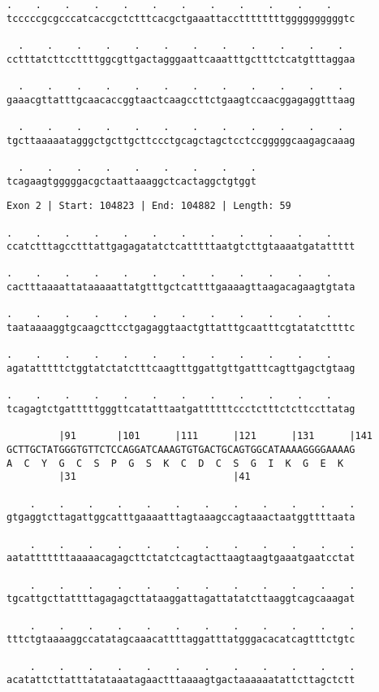 \documentclass{article}
\begin{document}
\newpage
\begin{Verbatim}[fontfamily=courier]
  .    .    .    .    .    .    .    .    .    .    .    .  
tcccccgcgcccatcaccgctctttcacgctgaaattaccttttttttggggggggggtc

  .    .    .    .    .    .    .    .    .    .    .    .  
cctttatcttccttttggcgttgactagggaattcaaatttgctttctcatgtttaggaa

  .    .    .    .    .    .    .    .    .    .    .    .  
gaaacgttatttgcaacaccggtaactcaagccttctgaagtccaacggagaggtttaag

  .    .    .    .    .    .    .    .    .    .    .    .  
tgcttaaaaatagggctgcttgcttccctgcagctagctcctccgggggcaagagcaaag

  .    .    .    .    .    .    .    .    .
tcagaagtgggggacgctaattaaaggctcactaggctgtggt
\end{Verbatim}
\newpage
\begin{Verbatim}[fontfamily=courier]
Exon 2 | Start: 104823 | End: 104882 | Length: 59

.    .    .    .    .    .    .    .    .    .    .    .    
ccatctttagcctttattgagagatatctcatttttaatgtcttgtaaaatgatattttt

.    .    .    .    .    .    .    .    .    .    .    .    
cactttaaaattataaaaattatgtttgctcattttgaaaagttaagacagaagtgtata

.    .    .    .    .    .    .    .    .    .    .    .    
taataaaaggtgcaagcttcctgagaggtaactgttatttgcaatttcgtatatcttttc

.    .    .    .    .    .    .    .    .    .    .    .    
agatatttttctggtatctatctttcaagtttggattgttgatttcagttgagctgtaag

.    .    .    .    .    .    .    .    .    .    .    .    
tcagagtctgatttttgggttcatatttaatgattttttccctctttctcttccttatag

         |91       |101      |111      |121      |131      |141
GCTTGCTATGGGTGTTCTCCAGGATCAAAGTGTGACTGCAGTGGCATAAAAGGGGAAAAG
A  C  Y  G  C  S  P  G  S  K  C  D  C  S  G  I  K  G  E  K  
         |31                           |41                  

    .    .    .    .    .    .    .    .    .    .    .    .
gtgaggtcttagattggcatttgaaaatttagtaaagccagtaaactaatggttttaata

    .    .    .    .    .    .    .    .    .    .    .    .
aatatttttttaaaaacagagcttctatctcagtacttaagtaagtgaaatgaatcctat

    .    .    .    .    .    .    .    .    .    .    .    .
tgcattgcttattttagagagcttataaggattagattatatcttaaggtcagcaaagat

    .    .    .    .    .    .    .    .    .    .    .    .
tttctgtaaaaggccatatagcaaacattttaggatttatgggacacatcagtttctgtc

    .    .    .    .    .    .    .    .    .    .    .    .
acatattcttatttatataaatagaactttaaaagtgactaaaaaatattcttagctctt
\end{Verbatim}
\end{document}
